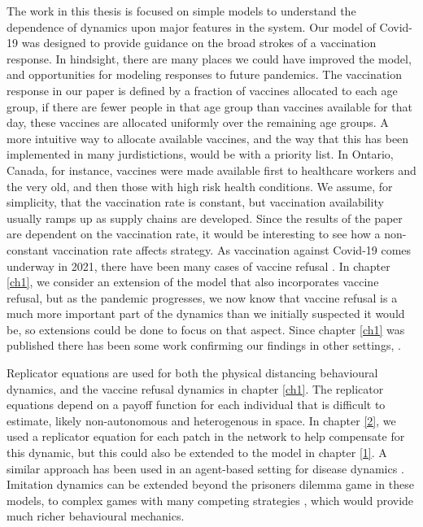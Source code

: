 The work in this thesis is focused on simple models to understand the dependence of dynamics upon major features in the system. Our model of Covid-19 was designed to provide guidance on the broad strokes of a vaccination response. In hindsight, there are many places we could have improved the model, and opportunities for modeling responses to future pandemics. The vaccination response in our paper is defined by a fraction of vaccines allocated to each age group, if there are fewer people in that age group than vaccines available for that day, these vaccines are allocated uniformly over the remaining age groups. A more intuitive way to allocate available vaccines, and the way that this has been implemented in many jurdistictions, would be with a priority list. In Ontario, Canada, for instance, vaccines were made available first to healthcare workers and the very old, and then those with high risk health conditions.  We assume, for simplicity, that the vaccination rate is constant, but vaccination availability usually ramps up as supply chains are developed. Since the results of the paper are dependent on the vaccination rate, it would be interesting to see how a non-constant vaccination rate affects strategy. As vaccination against Covid-19 comes underway in 2021, there have been many cases of vaccine refusal \cite{schwarzinger2021covid,soares2021factors,callaghan2020correlates}. In chapter \ref{ch1}, we consider an extension of the model that also incorporates vaccine refusal, but as the pandemic progresses, we now know that vaccine refusal is a much more important part of the dynamics than we initially suspected it would be, so extensions could be done to focus on that aspect. Since chapter \ref{ch1} was published there has been some work confirming our findings in other settings, \cite{chen2021age,hogan2021within}.

Replicator equations are used for both the physical distancing behavioural dynamics, and the vaccine refusal dynamics in chapter \ref{ch1}. The replicator equations depend on a payoff function for each individual that is difficult to estimate, likely non-autonomous and heterogenous in space. In chapter \ref{2}, we used a replicator equation for each patch in the network to help compensate for this dynamic, but this could also be extended to the model in chapter \ref{1}. A similar approach has been used in an agent-based setting for disease dynamics \cite{fair2021population}. Imitation dynamics can be extended beyond the prisoners dilemma game in these models, to complex games with many competing strategies \cite{hofbauer1998evolutionary}, which would provide much richer behavioural mechanics.

